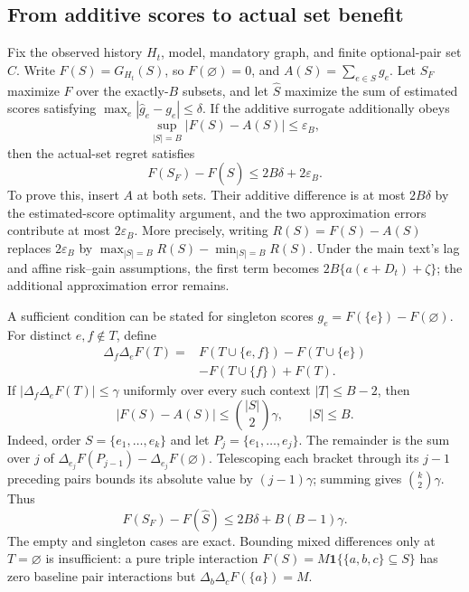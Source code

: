 \subsection{From additive scores to actual set benefit}
\label{sec:nonadditive-allocation}
Fix the observed history $H_t$, model, mandatory graph, and finite optional-pair set
$C$. Write $F(S)=G_{H_t}(S)$, so $F(\varnothing)=0$, and
$A(S)=\sum_{e\in S}g_e$. Let $S_F$ maximize $F$ over the exactly-$B$
subsets, and let $\widehat S$ maximize the sum of estimated scores satisfying
$\max_e|\widehat g_e-g_e|\le\delta$. If the additive surrogate additionally
obeys
\begin{equation}
 \sup_{|S|=B}|F(S)-A(S)|\le\varepsilon_B,
 \label{eq:uniform-additive-approximation}
\end{equation}
then the actual-set regret satisfies
\begin{equation}
 F(S_F)-F(\widehat S)\le2B\delta+2\varepsilon_B.
 \label{eq:nonadditive-regret}
\end{equation}
To prove this, insert $A$ at both sets. Their additive difference is at most
$2B\delta$ by the estimated-score optimality argument, and the two
approximation errors contribute at most $2\varepsilon_B$. More precisely,
writing $R(S)=F(S)-A(S)$ replaces $2\varepsilon_B$ by
$\max_{|S|=B}R(S)-\min_{|S|=B}R(S)$. Under the main text's lag and affine
risk--gain assumptions, the first term becomes
$2B\{a(\epsilon+D_t)+\zeta\}$; the additional approximation error remains.

A sufficient condition can be stated for singleton scores
$g_e=F(\{e\})-F(\varnothing)$. For distinct $e,f\notin T$, define
\begin{align}
 \Delta_f\Delta_eF(T)
 ={}&F(T\cup\{e,f\})-F(T\cup\{e\})\nonumber\\
 &-F(T\cup\{f\})+F(T).
\end{align}
If $|\Delta_f\Delta_eF(T)|\le\gamma$ uniformly over every such context
$|T|\le B-2$, then
\begin{equation}
 |F(S)-A(S)|\le\binom{|S|}{2}\gamma,
 \qquad |S|\le B.
 \label{eq:mixed-difference-remainder}
\end{equation}
Indeed, order $S=\{e_1,\ldots,e_k\}$ and let
$P_j=\{e_1,\ldots,e_j\}$. The remainder is the sum over $j$ of
$\Delta_{e_j}F(P_{j-1})-\Delta_{e_j}F(\varnothing)$. Telescoping each
bracket through its $j-1$ preceding pairs bounds its absolute value by
$(j-1)\gamma$; summing gives $\binom{k}{2}\gamma$. Thus
\begin{equation}
 F(S_F)-F(\widehat S)\le2B\delta+B(B-1)\gamma.
 \label{eq:interaction-regret}
\end{equation}
The empty and singleton cases are exact. Bounding mixed differences only at
$T=\varnothing$ is insufficient: a pure triple interaction
$F(S)=M\mathbf1\{\{a,b,c\}\subseteq S\}$ has zero baseline pair
interactions but $\Delta_b\Delta_cF(\{a\})=M$.

